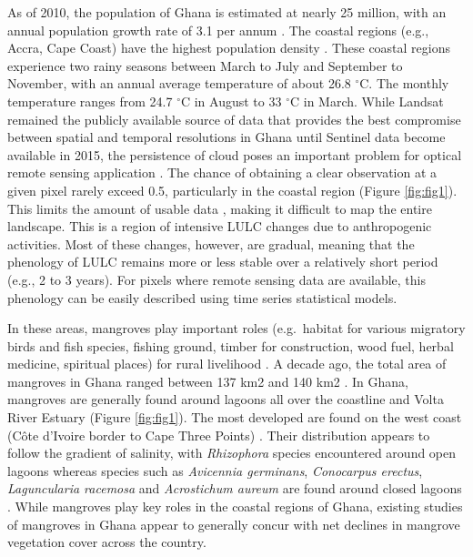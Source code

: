 \documentclass[12pt,oneside,preprint,3p,authoryear,times]{elsarticle} %
\begin{document}
As of 2010, the population of Ghana is estimated at nearly 25 million,
with an annual population growth rate of 3.1 per annum
\citep{Ghana-Statistical-Services-2012}. The coastal regions (e.g.,
Accra, Cape Coast) have the highest population density
\citep{Addae-and-Oppelt-2019}. These coastal regions experience two
rainy seasons between March to July and September to November, with an
annual average temperature of about 26.8 \(^\circ\)C. The monthly
temperature ranges from 24.7 \(^\circ\)C in August to 33 \(^\circ\)C in
March. While Landsat remained the publicly available source of data that
provides the best compromise between spatial and temporal resolutions in
Ghana until Sentinel data become available in 2015, the persistence of
cloud poses an important problem for optical remote sensing application
\citep{Ashiagbor-et-al-2021}. The chance of obtaining a clear
observation at a given pixel rarely exceed 0.5, particularly in the
coastal region (Figure \ref{fig:fig1}). This limits the amount of usable
data \citep{Ashiagbor-et-al-2021}, making it difficult to map the entire
landscape. This is a region of intensive LULC changes due to
anthropogenic activities. Most of these changes, however, are gradual,
meaning that the phenology of LULC remains more or less stable over a
relatively short period (e.g., 2 to 3 years). For pixels where remote
sensing data are available, this phenology can be easily described using
time series statistical models.

In these areas, mangroves play important roles (e.g.~habitat for various
migratory birds and fish species, fishing ground, timber for
construction, wood fuel, herbal medicine, spiritual places) for rural
livelihood
\citep{Armah-et-al-2005, Spalding-et-al-1997, Spalding-et-al-2010, UNEP-2007}.
A decade ago, the total area of mangroves in Ghana ranged between 137
km2 and 140 km2 \citep{Armah-et-al-2009, UNEP-2007}. In Ghana, mangroves
are generally found around lagoons all over the coastline and Volta
River Estuary (Figure \ref{fig:fig1}). The most developed are found on
the west coast (Côte d'Ivoire border to Cape Three Points)
\citep{Spalding-et-al-1997}. Their distribution appears to follow the
gradient of salinity, with \emph{Rhizophora} species encountered around
open lagoons whereas species such as \emph{Avicennia germinans},
\emph{Conocarpus erectus}, \emph{Laguncularia racemosa} and
\emph{Acrostichum aureum} are found around closed lagoons
\citep{Spalding-et-al-1997}. While mangroves play key roles in the
coastal regions of Ghana, existing studies of mangroves in Ghana appear
to generally concur with net declines in mangrove vegetation cover
across the country.
\end{document}
